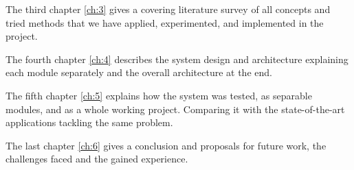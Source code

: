 The third chapter \ref{ch:3} gives a covering literature survey of all concepts and tried methods that we have applied, experimented, and implemented in the project.\newline 

The fourth chapter \ref{ch:4} describes the system design and architecture explaining each module separately and the overall architecture at the end.\newline

The fifth chapter \ref{ch:5} explains how the system was tested, as separable modules, and as a whole working project. Comparing it with the state-of-the-art applications tackling the same problem. \newline

The last chapter \ref{ch:6} gives a conclusion and proposals for future work, the challenges faced and the gained experience.